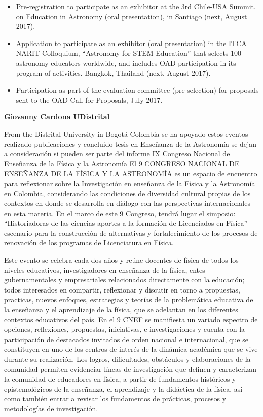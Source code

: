 \begin{itemize}
    \item Pre-registration to participate as an exhibitor at the 3rd Chile-USA Summit. on Education in Astronomy (oral presentation), in Santiago (next, August 2017).

    \item Application to participate as an exhibitor (oral presentation) in the ITCA NARIT Colloquium, “Astronomy for STEM Education” that selects 100 astronomy educators worldwide, and includes OAD participation in its program of activities. Bangkok, Thailand (next, August 2017).

    \item Participation as part of the evaluation committee (pre-selection) for proposals sent to the OAD Call for Proposals, July 2017.
\end{itemize}    
\newpage

\textbf{ Giovanny Cardona UDistrital}

From the Distrital University in Bogotá Colombia se ha apoyado estos eventos realizado publicaciones y concluido tesis en Enseñanza de la Astronomía se dejan a consideración si pueden ser parte del informe
IX Congreso Nacional de Enseñanza de la Física y la Astronomía
El 9 CONGRESO NACIONAL DE ENSEÑANZA DE LA FÍSICA Y LA ASTRONOMÍA es un espacio de encuentro para reflexionar sobre la Investigación en enseñanza de la Física y la Astronomía en Colombia, considerando las condiciones de diversidad cultural propias de los contextos en donde se desarrolla en diálogo con las perspectivas internacionales en esta materia. En el marco de este 9 Congreso, tendrá lugar el simposio: “Historiadoras de las ciencias aportes a la formación de Licenciados en Física” escenario para la construcción de alternativas y fortalecimiento de los procesos de renovación de los programas de Licenciatura en Física.

Este evento se celebra cada dos años y reúne docentes de física de todos los niveles educativos, investigadores en enseñanza de la física, entes gubernamentales y empresariales relacionados directamente con la educación; todos interesados en compartir, reflexionar y discutir en torno a propuestas, practicas, nuevos enfoques, estrategias y teorías de la problemática educativa de la enseñanza y el aprendizaje de la física, que se adelantan en los diferentes contextos educativos del país.
En el 9 CNEF se manifiesta un variado espectro de opciones, reflexiones, propuestas, iniciativas, e investigaciones y cuenta con la participación de destacados invitados de orden nacional e internacional, que se constituyen en uno de los centros de interés de la dinámica académica que se vive durante su realización. Los logros, dificultades, obstáculos y elaboraciones de la comunidad permiten evidenciar líneas de investigación que definen y caracterizan la comunidad de educadores en física, a partir de fundamentos históricos y epistemológicos de la enseñanza, el aprendizaje y la didáctica de la física, así como también entrar a revisar los fundamentos de prácticas, procesos y metodologías de investigación.

